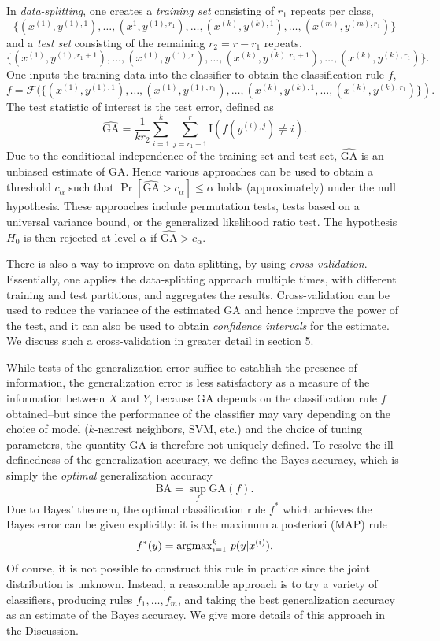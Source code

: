 \documentclass[12pt]{article}
\begin{document}
In \emph{data-splitting}, one creates a \emph{training
set} consisting of $r_1$ repeats per class,
\[
\{(x^{(1)}, y^{(1),1}),\hdots, (x^1,y^{(1), r_1}), \hdots, (x^{(k)}, y^{(k),1}),\hdots, (x^{(m)},y^{(m), r_1})\}
\]
and a \emph{test set} consisting of the remaining $r_2 = r - r_1$ repeats.
\[
\{(x^{(1)}, y^{(1), r_1 + 1}),\hdots, (x^{(1)},y^{(1),r}), \hdots, (x^{(k)}, y^{(k), r_1 + 1}),\hdots, (x^{(k)},y^{(k),r_1})\}.
\]
One inputs the training data into the classifier to obtain the classification rule $f$,
\[
f = \mathcal{F}(\{(x^{(1)}, y^{(1),1}),\hdots, (x^{(1)},y^{(1),r_1}), \hdots, (x^{(k)}, y^{(k),1},\hdots, (x^{(k)},y^{(k), r_1})\}).
\]
The test statistic of interest is the test error,
defined as
\[
\widehat{\text{GA}} = \frac{1}{k r_2} \sum_{i=1}^k \sum_{j = r_1 + 1}^r \text{I}(f(y^{(i),j}) \neq i).
\]
Due to the conditional independence of the training set and test set,
$\widehat{\text{GA}}$ is an unbiased estimate of $\text{GA}$.  Hence various
approaches can be used to obtain a threshold $c_\alpha$ such that
$\Pr[\widehat{\text{GA}} > c_\alpha] \leq \alpha$ holds (approximately) under the
null hypothesis.  These approaches include permutation tests, tests
based on a universal variance bound, or the generalized likelihood
ratio test.  The hypothesis $H_0$ is then rejected at level $\alpha$
if $\widehat{\text{GA}} > c_\alpha$.

There is also a way to improve on data-splitting, by
using \emph{cross-validation}. Essentially, one applies the
data-splitting approach multiple times, with different training and
test partitions, and aggregates the results. Cross-validation can be
used to reduce the variance of the estimated $\text{GA}$ and hence
improve the power of the test, and it can also be used to
obtain \emph{confidence intervals} for the estimate.  We discuss such
a cross-validation in greater detail in section 5.

While tests of the generalization error suffice to establish the
presence of information, the generalization error is less satisfactory
as a measure of the information between $X$ and $Y$, because
$\text{GA}$ depends on the classification rule $f$ obtained--but since the performance of the classifier
may vary depending on the choice of model ($k$-nearest neighbors, SVM, etc.) and the choice of tuning parameters,
the quantity $\text{GA}$ is therefore not uniquely defined.
To resolve the ill-definedness of the generalization accuracy, we define
the Bayes accuracy, which is simply the \emph{optimal}
generalization accuracy
\[
\text{BA} = \sup_f \text{GA}(f).
\]
Due to Bayes' theorem, the optimal classification rule $f^*$ which
achieves the Bayes error can be given explicitly: it is the maximum a
posteriori (MAP) rule
\[
f^*(y) = \text{argmax}_{i=1}^k\ p(y|x^{(i)}).
\]
Of course, it is not possible to construct this rule in practice since
the joint distribution is unknown.  Instead, a reasonable approach is
to try a variety of classifiers, producing rules $f_1,\hdots, f_m$,
and taking the best generalization accuracy as an estimate of the Bayes
accuracy.  We give more details of this approach in the Discussion.
\end{document}
